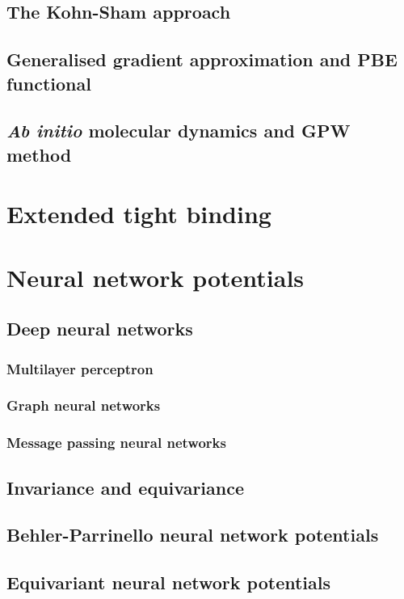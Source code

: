 \subsection{The Kohn-Sham approach}

\subsection{Generalised gradient approximation and PBE functional}

\subsection{\textit{Ab initio} molecular dynamics and GPW method}



\section{Extended tight binding}



\section{Neural network potentials}

\subsection{Deep neural networks}

\subsubsection{Multilayer perceptron}

\subsubsection{Graph neural networks}

\subsubsection{Message passing neural networks}

\subsection{Invariance and equivariance}

\subsection{Behler-Parrinello neural network potentials}

\subsection{Equivariant neural network potentials}